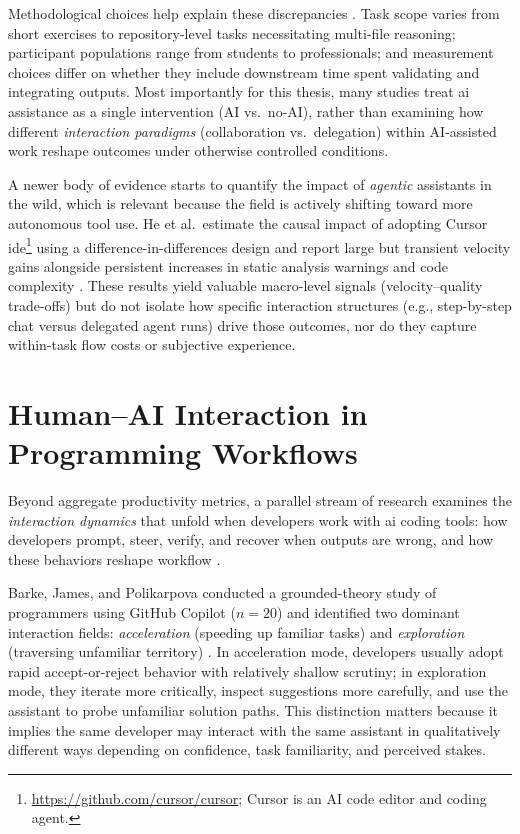 Methodological choices help explain these discrepancies \parencite{wohlin2012experimentation}. Task scope varies from short exercises to repository-level tasks necessitating multi-file reasoning; participant populations range from students to professionals; and measurement choices differ on whether they include downstream time spent validating and integrating outputs. Most importantly for this thesis, many studies treat \gls{ai} assistance as a single intervention (AI vs.\ no-AI), rather than examining how different \emph{interaction paradigms} (collaboration vs.\ delegation) within AI-assisted work reshape outcomes under otherwise controlled conditions.

A newer body of evidence starts to quantify the impact of \emph{agentic} assistants in the wild, which is relevant because the field is actively shifting toward more autonomous tool use. He et al.\ estimate the causal impact of adopting Cursor \gls{ide}\footnote{\url{https://github.com/cursor/cursor}; Cursor is an AI code editor and coding agent.} using a difference-in-differences design and report large but transient velocity gains alongside persistent increases in static analysis warnings and code complexity \parencite{he2025cursorDID}. These results yield valuable macro-level signals (velocity--quality trade-offs) but do not isolate how specific interaction structures (e.g., step-by-step chat versus delegated agent runs) drive those outcomes, nor do they capture within-task flow costs or subjective experience.


\section{Human--AI Interaction in Programming Workflows}

\label{sec:rw-interaction}

Beyond aggregate productivity metrics, a parallel stream of research examines the \emph{interaction dynamics} that unfold when developers work with \gls{ai} coding tools: how developers prompt, steer, verify, and recover when outputs are wrong, and how these behaviors reshape workflow \parencite{barke2023groundedcopilot, mozannar2024reading}.

Barke, James, and Polikarpova conducted a grounded-theory study of programmers using GitHub Copilot ($n=20$) and identified two dominant interaction fields: \emph{acceleration} (speeding up familiar tasks) and \emph{exploration} (traversing unfamiliar territory) \parencite{barke2023groundedcopilot}. In acceleration mode, developers usually adopt rapid accept-or-reject behavior with relatively shallow scrutiny; in exploration mode, they iterate more critically, inspect suggestions more carefully, and use the assistant to probe unfamiliar solution paths. This distinction matters because it implies the same developer may interact with the same assistant in qualitatively different ways depending on confidence, task familiarity, and perceived stakes.

